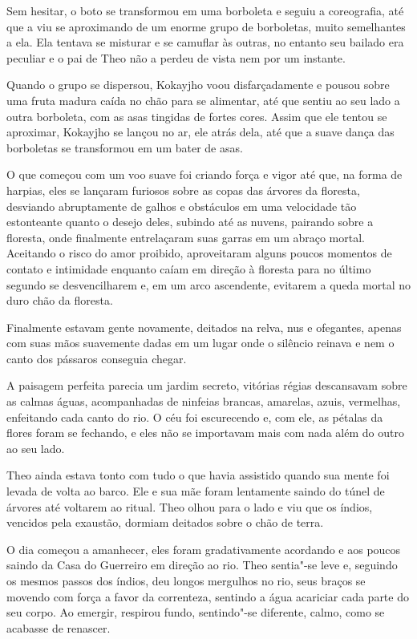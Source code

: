 Sem hesitar, o boto se transformou em uma borboleta e seguiu a
coreografia, até que a viu se aproximando de um enorme grupo de
borboletas, muito semelhantes a ela. Ela tentava se misturar e se
camuflar às outras, no entanto seu bailado era peculiar e o pai de Theo
não a perdeu de vista nem por um instante.

Quando o grupo se dispersou, Kokayjho voou disfarçadamente e pousou
sobre uma fruta madura caída no chão para se alimentar, até que sentiu
ao seu lado a outra borboleta, com as asas tingidas de fortes cores.
Assim que ele tentou se aproximar, Kokayjho se lançou no ar, ele atrás
dela, até que a suave dança das borboletas se transformou em um bater de
asas.

O que começou com um voo suave foi criando força e vigor até que, na
forma de harpias, eles se lançaram furiosos sobre as copas das árvores
da floresta, desviando abruptamente de galhos e obstáculos em uma
velocidade tão estonteante quanto o desejo deles, subindo até as nuvens,
pairando sobre a floresta, onde finalmente entrelaçaram suas garras em
um abraço mortal. Aceitando o risco do amor proibido, aproveitaram
alguns poucos momentos de contato e intimidade enquanto caíam em direção
à floresta para no último segundo se desvencilharem e, em um arco
ascendente, evitarem a queda mortal no duro chão da floresta.

Finalmente estavam gente novamente, deitados na relva, nus e ofegantes,
apenas com suas mãos suavemente dadas em um lugar onde o silêncio
reinava e nem o canto dos pássaros conseguia chegar.

A paisagem perfeita parecia um jardim secreto, vitórias régias
descansavam sobre as calmas águas, acompanhadas de ninfeias brancas,
amarelas, azuis, vermelhas, enfeitando cada canto do rio. O céu foi
escurecendo e, com ele, as pétalas da flores foram se fechando, e eles não
se importavam mais com nada além do outro ao seu lado.

Theo ainda estava tonto com tudo o que havia assistido quando sua mente
foi levada de volta ao barco. Ele e sua mãe foram lentamente saindo do
túnel de árvores até voltarem ao ritual. Theo olhou para o lado e viu
que os índios, vencidos pela exaustão, dormiam deitados sobre o chão de
terra.

O dia começou a amanhecer, eles foram gradativamente acordando e aos
poucos saindo da Casa do Guerreiro em direção ao rio. Theo sentia"-se
leve e, seguindo os mesmos passos dos índios, deu longos mergulhos no
rio, seus braços se movendo com força a favor da correnteza, sentindo a
água acariciar cada parte do seu corpo. Ao emergir, respirou fundo,
sentindo"-se diferente, calmo, como se acabasse de renascer.

